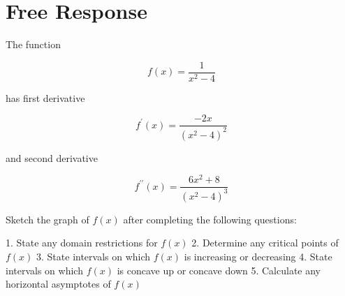 \documentclass{article}
\begin{document}
\section{Free Response}

The function

$$
f(x)=\frac{1}{x^{2}-4}
$$

has first derivative

$$
f^{\prime}(x)=\frac{-2 x}{\left(x^{2}-4\right)^{2}}
$$

and second derivative

$$
f^{\prime \prime}(x)=\frac{6 x^{2}+8}{\left(x^{2}-4\right)^{3}}
$$

Sketch the graph of $f(x)$ after completing the following questions:

1. State any domain restrictions for $f(x)$
2. Determine any critical points of $f(x)$
3. State intervals on which $f(x)$ is increasing or decreasing
4. State intervals on which $f(x)$ is concave up or concave down
5. Calculate any horizontal asymptotes of $f(x)$
\end{document}
